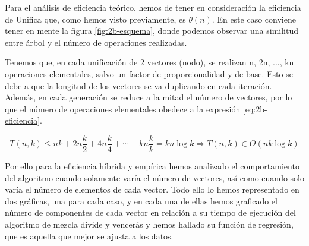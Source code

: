 Para el análisis de eficiencia teórico, hemos de tener en consideración la eficiencia de Unifica que, como hemos visto
previamente, es $\theta (n)$. En este caso conviene tener en mente la figura \ref{fig:2b-esquema}, donde podemos
observar una similitud entre árbol y el número de operaciones realizadas. 

Tenemos que, en cada unificación de 2 vectores (nodo), se realizan n, 2n, ..., kn operaciones elementales, salvo un factor de
proporcionalidad y de base. Esto se debe a que la longitud de los vectores se va duplicando en cada iteración. 
Además, en cada generación se reduce a la mitad el número de vectores, por lo que el número de operaciones elementales
obedece a la expresión \ref{eq:2b-eficiencia}. 

\begin{equation}
	\label{eq:2b-eficiencia}
	T(n,k) \leq nk + 2n\frac{k}{2} + 4n\frac{k}{4} + \cdots + kn\frac{k}{k} = kn \log k \Rightarrow \boxed{T(n,k) \in O(nk \log k)} 
\end{equation}

Por ello para la eficiencia híbrida y empírica hemos analizado el comportamiento del algoritmo cuando solamente varía el número de vectores, así como cuando solo varía el número de 
elementos de cada vector. 
Todo ello lo hemos representado en dos gráficas, una para cada caso, y en cada una de ellas hemos graficado el número de componentes de cada vector en relación a su tiempo de ejecución del algoritmo de mezcla
divide y vencerás y hemos hallado su función de regresión, que es aquella que mejor se ajusta a los datos.

